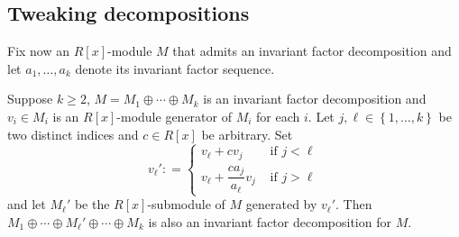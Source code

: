 \documentclass[ALCO, Unicode]{cedram}
\begin{document}
\subsection{Tweaking  decompositions}   Fix now  an $R[x]$-module $ M$  that admits an invariant factor decomposition and let $ a_{1}, \ldots, a_{k} $ denote  its invariant factor sequence.    
\begin{lemma} \label{tweak}    Suppose $k \geq 2$, $ M =  M_{1} \oplus \cdots \oplus M_{k} $ is an invariant factor decomposition and $v_i \in M_i$ is an $R[x]$-module generator of $M_i$ for each $i$.   Let $ j , \ell  \in \left \{1, \ldots , k \right \} $ be two distinct  indices  and $ c \in R[x] $ be arbitrary.  Set $$   v_{\ell} '  :    =  \begin{cases} v_{\ell} + c v_{j} & \text{ if } j < \ell \\[0.5em]    
v_{\ell}  + \dfrac{ c  a_{j}}   {  a_{\ell}    }      v_{j}  & \text{ if } j > \ell 
\end{cases}  
$$  
and let $ M_{\ell} ' $ be the $R[x] $-submodule of  $ M $  generated by $ v_{\ell} ' $. Then $ M_{1} \oplus \cdots \oplus M_{\ell}' \oplus \cdots \oplus M_{k}  $ is also an  invariant factor decomposition for $ M $.    
\end{lemma}       
\end{document}
